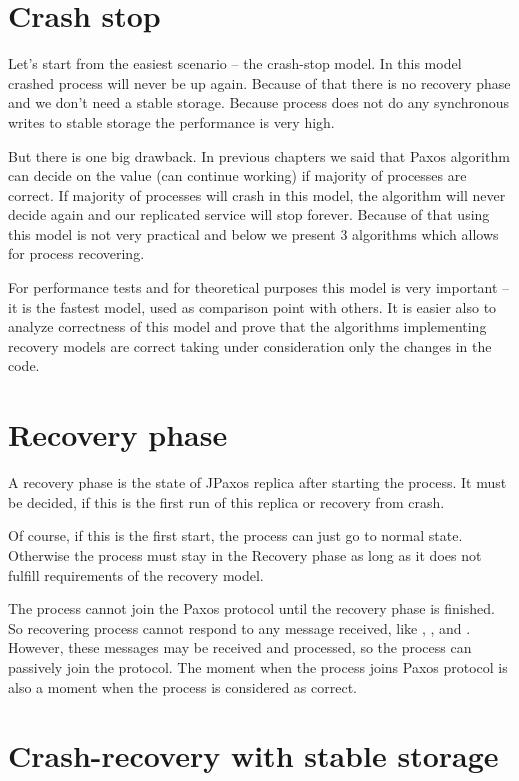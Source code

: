 \section{Crash stop}
\label{sec:crash_stop}

Let's start from the easiest scenario -- the crash-stop model. In this model crashed process will never be up again.
Because of that there is no recovery phase and we don't need a stable storage. Because process does not do any synchronous writes to stable storage the performance is very high. 

But there is one big drawback. In previous chapters we said that Paxos algorithm can decide on the value (can continue working) if majority of processes are correct. If majority of processes will crash in this model, the algorithm will never decide again and our replicated service will stop forever. Because of that using this model is not very practical and below we present 3 algorithms which allows for process recovering.

For performance tests and for theoretical purposes this model is very important -- it is the fastest model, used as comparison point with others. It is easier also to analyze correctness of this model and prove that the algorithms implementing recovery models are correct taking under consideration only the changes in the code.

\section{Recovery phase}

A recovery phase is the state of JPaxos replica after starting the process. It must be decided, if this is the first run of this replica or recovery from crash.

Of course, if this is the first start, the process can just go to normal state. Otherwise the process must stay in the Recovery phase as long as it does not fulfill requirements of the recovery model.

The process cannot join the Paxos protocol until the recovery phase is finished. So recovering process cannot respond to any message received, like \propose, \accept, \prepare and \prepareOK. However, these messages may be received and processed, so the process can passively join the protocol. The moment when the process joins Paxos protocol is also a moment when the process is considered as correct.


\section{Crash-recovery with stable storage}
\label{sec:full_ss}

